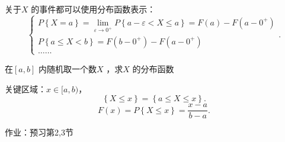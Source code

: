 关于$X$ 的事件都可以使用分布函数表示：
\[
    \begin{cases}
        P\left\{ X=a \right\} =\lim_{\varepsilon \to 0^+} P\left\{ a-\varepsilon<X\le a \right\} =F\left( a \right) -F\left( a-0^+ \right) \\
        P\left\{ a\le X<b \right\} =F\left( b-0^+ \right) -F\left( a-0^+ \right) \\
        \ldots\ldots
    \end{cases}
.\] 
\begin{eg}
    在$\left[ a,b \right] $ 内随机取一个数$X$ ，求$X$ 的分布函数

    关键区域：$x\in [a,b)$，\[
        \left\{ X\le x \right\} =\left\{ a\le X\le x \right\} 
    .\] 
    \[
        F\left( x \right) =P\left\{ X\le x \right\} =\frac{x-a}{b-a}
    .\] 
\end{eg}
作业：预习第2,3节
